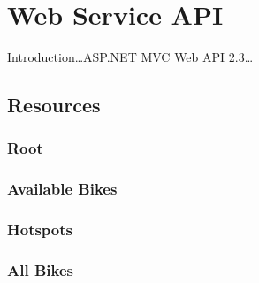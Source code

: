 \section{Web Service API}
Introduction\dots ASP.NET MVC Web API 2.3\dots

\subsection{Resources}

\subsubsection{Root}

\subsubsection{Available Bikes}

\subsubsection{Hotspots}

\subsubsection{All Bikes}
